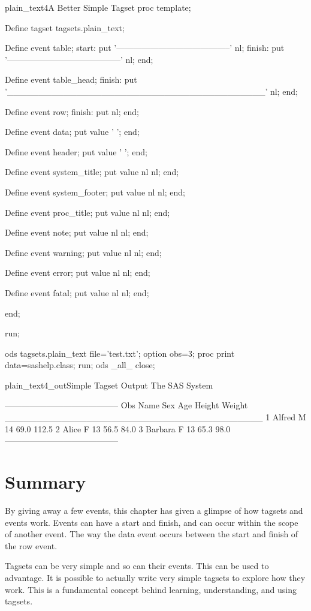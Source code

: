 \begin{fvcode}{plain_text4}{A Better Simple Tagset}
proc template;

     Define tagset tagsets.plain_text;

         Define event table;
             start:
                 put '-----------------------------------------' nl;
             finish:
                 put '-----------------------------------------' nl;
         end;

         Define event table_head;
             finish:
                 put '_________________________________________' nl;
         end;

         Define event row;
             finish:
             put nl;
         end;

         Define event data;
             put value '   ';
         end;

         Define event header;
             put value ' ';
         end;

         Define event system_title;
             put value nl nl;
         end;

         Define event system_footer;
             put value nl nl;
         end;

         Define event proc_title;
             put value nl nl;
         end;

         Define event note;
             put value nl nl;
         end;

         Define event warning;
             put value nl nl;
         end;

         Define event error;
             put value nl nl;
         end;

         Define event fatal;
             put value nl nl;
         end;

     end; 

 run;

 ods tagsets.plain_text file='test.txt';
 option obs=3;
 proc print data=sashelp.class; run;
 ods _all_ close;
\end{fvcode}

\begin{poutput}{plain_text4_out}{Simple Tagset Output}
The SAS System

-----------------------------------------
Obs Name Sex Age Height Weight 
_________________________________________
 1 Alfred   M   14   69.0   112.5   
 2 Alice   F   13   56.5    84.0   
 3 Barbara   F   13   65.3    98.0   
-----------------------------------------
\end{poutput}

\section{Summary}
By giving away a few events, this chapter has given a
glimpse of how tagsets and events work.  Events can have a start
and finish, and can occur within the scope of another event.  The way
the data event occurs between the start and finish of the row event.

Tagsets can be very simple and so can their events.  This can be used
to advantage.  It is possible to actually write very simple tagsets to explore
how they work.  This is a fundamental concept behind learning, understanding,
and using tagsets.  
